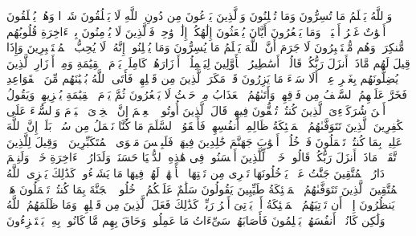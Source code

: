 وَٱللَّهُ یَعۡلَمُ مَا تُسِرُّونَ وَمَا تُعۡلِنُونَ%
\stopbuffer
\startbuffer[\q:16:20]
وَٱلَّذِینَ یَدۡعُونَ مِن دُونِ ٱللَّهِ لَا یَخۡلُقُونَ شَیۡءࣰا وَهُمۡ یُخۡلَقُونَ%
\stopbuffer
\startbuffer[\q:16:21]
أَمۡوَٰتٌ غَیۡرُ أَحۡیَاۤءࣲۖ وَمَا یَشۡعُرُونَ أَیَّانَ یُبۡعَثُونَ%
\stopbuffer
\startbuffer[\q:16:22]
إِلَٰهُكُمۡ إِلَٰهࣱ وَٰحِدࣱۚ فَٱلَّذِینَ لَا یُؤۡمِنُونَ بِٱلۡءَاخِرَةِ قُلُوبُهُم مُّنكِرَةࣱ وَهُم مُّسۡتَكۡبِرُونَ%
\stopbuffer
\startbuffer[\q:16:23]
لَا جَرَمَ أَنَّ ٱللَّهَ یَعۡلَمُ مَا یُسِرُّونَ وَمَا یُعۡلِنُونَۚ إِنَّهُۥ لَا یُحِبُّ ٱلۡمُسۡتَكۡبِرِینَ%
\stopbuffer
\startbuffer[\q:16:24]
وَإِذَا قِیلَ لَهُم مَّاذَاۤ أَنزَلَ رَبُّكُمۡ قَالُوۤا۟ أَسَٰطِیرُ ٱلۡأَوَّلِینَ%
\stopbuffer
\startbuffer[\q:16:25]
لِیَحۡمِلُوۤا۟ أَوۡزَارَهُمۡ كَامِلَةࣰ یَوۡمَ ٱلۡقِیَٰمَةِ وَمِنۡ أَوۡزَارِ ٱلَّذِینَ یُضِلُّونَهُم بِغَیۡرِ عِلۡمٍۗ أَلَا سَاۤءَ مَا یَزِرُونَ%
\stopbuffer
\startbuffer[\q:16:26]
قَدۡ مَكَرَ ٱلَّذِینَ مِن قَبۡلِهِمۡ فَأَتَى ٱللَّهُ بُنۡیَٰنَهُم مِّنَ ٱلۡقَوَاعِدِ فَخَرَّ عَلَیۡهِمُ ٱلسَّقۡفُ مِن فَوۡقِهِمۡ وَأَتَىٰهُمُ ٱلۡعَذَابُ مِنۡ حَیۡثُ لَا یَشۡعُرُونَ%
\stopbuffer
\startbuffer[\q:16:27]
ثُمَّ یَوۡمَ ٱلۡقِیَٰمَةِ یُخۡزِیهِمۡ وَیَقُولُ أَیۡنَ شُرَكَاۤءِیَ ٱلَّذِینَ كُنتُمۡ تُشَٰۤقُّونَ فِیهِمۡۚ قَالَ ٱلَّذِینَ أُوتُوا۟ ٱلۡعِلۡمَ إِنَّ ٱلۡخِزۡیَ ٱلۡیَوۡمَ وَٱلسُّوۤءَ عَلَى ٱلۡكَٰفِرِینَ%
\stopbuffer
\startbuffer[\q:16:28]
ٱلَّذِینَ تَتَوَفَّىٰهُمُ ٱلۡمَلَٰۤئِكَةُ ظَالِمِیۤ أَنفُسِهِمۡۖ فَأَلۡقَوُا۟ ٱلسَّلَمَ مَا كُنَّا نَعۡمَلُ مِن سُوۤءِۭۚ بَلَىٰۤۚ إِنَّ ٱللَّهَ عَلِیمُۢ بِمَا كُنتُمۡ تَعۡمَلُونَ%
\stopbuffer
\startbuffer[\q:16:29]
فَٱدۡخُلُوۤا۟ أَبۡوَٰبَ جَهَنَّمَ خَٰلِدِینَ فِیهَاۖ فَلَبِئۡسَ مَثۡوَى ٱلۡمُتَكَبِّرِینَ%
\stopbuffer
\startbuffer[\q:16:30]
۞ وَقِیلَ لِلَّذِینَ ٱتَّقَوۡا۟ مَاذَاۤ أَنزَلَ رَبُّكُمۡۚ قَالُوا۟ خَیۡرࣰاۗ لِّلَّذِینَ أَحۡسَنُوا۟ فِی هَٰذِهِ ٱلدُّنۡیَا حَسَنَةࣱۚ وَلَدَارُ ٱلۡءَاخِرَةِ خَیۡرࣱۚ وَلَنِعۡمَ دَارُ ٱلۡمُتَّقِینَ%
\stopbuffer
\startbuffer[\q:16:31]
جَنَّٰتُ عَدۡنࣲ یَدۡخُلُونَهَا تَجۡرِی مِن تَحۡتِهَا ٱلۡأَنۡهَٰرُۖ لَهُمۡ فِیهَا مَا یَشَاۤءُونَۚ كَذَٰلِكَ یَجۡزِی ٱللَّهُ ٱلۡمُتَّقِینَ%
\stopbuffer
\startbuffer[\q:16:32]
ٱلَّذِینَ تَتَوَفَّىٰهُمُ ٱلۡمَلَٰۤئِكَةُ طَیِّبِینَ یَقُولُونَ سَلَٰمٌ عَلَیۡكُمُ ٱدۡخُلُوا۟ ٱلۡجَنَّةَ بِمَا كُنتُمۡ تَعۡمَلُونَ%
\stopbuffer
\startbuffer[\q:16:33]
هَلۡ یَنظُرُونَ إِلَّاۤ أَن تَأۡتِیَهُمُ ٱلۡمَلَٰۤئِكَةُ أَوۡ یَأۡتِیَ أَمۡرُ رَبِّكَۚ كَذَٰلِكَ فَعَلَ ٱلَّذِینَ مِن قَبۡلِهِمۡۚ وَمَا ظَلَمَهُمُ ٱللَّهُ وَلَٰكِن كَانُوۤا۟ أَنفُسَهُمۡ یَظۡلِمُونَ%
\stopbuffer
\startbuffer[\q:16:34]
فَأَصَابَهُمۡ سَیِّءَاتُ مَا عَمِلُوا۟ وَحَاقَ بِهِم مَّا كَانُوا۟ بِهِۦ یَسۡتَهۡزِءُونَ%
\stopbuffer
